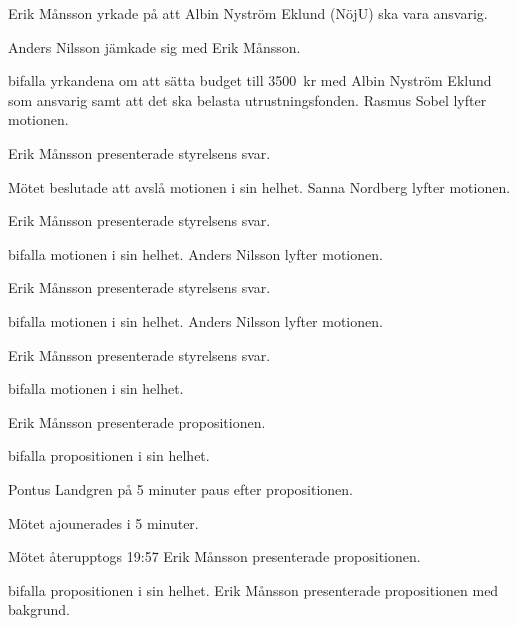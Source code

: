 \documentclass[10pt]{article}
\begin{document}
\begin{paragrafer}
\begin{paragrafer}
          Erik Månsson yrkade på att Albin Nyström Eklund (NöjU) ska vara ansvarig.

          Anders Nilsson jämkade sig med Erik Månsson.

          \Mba bifalla yrkandena om att sätta budget till \SI{3500}{kr} med Albin Nyström Eklund som ansvarig samt att det ska belasta utrustningsfonden.
          Rasmus Sobel lyfter motionen.

          Erik Månsson presenterade styrelsens svar.

          Mötet beslutade att avslå motionen i sin helhet.
          Sanna Nordberg lyfter motionen.

          Erik Månsson presenterade styrelsens svar.

          \Mba bifalla motionen i sin helhet.
          Anders Nilsson lyfter motionen.

          Erik Månsson presenterade styrelsens svar.

          \Mba bifalla motionen i sin helhet.
          Anders Nilsson lyfter motionen.

          Erik Månsson presenterade styrelsens svar.

          \Mba bifalla motionen i sin helhet.
      \end{paragrafer}


          \begin{paragrafer}
            Erik Månsson presenterade propositionen.

            \Mba bifalla propositionen i sin helhet.

            Pontus Landgren \ypa på 5 minuter paus efter propositionen.

            Mötet ajounerades i 5 minuter.

            Mötet återupptogs 19:57
            Erik Månsson presenterade propositionen.

            \Mba bifalla propositionen i sin helhet.
            Erik Månsson presenterade propositionen med bakgrund.


\end{paragrafer}
\end{paragrafer}
\end{document}
